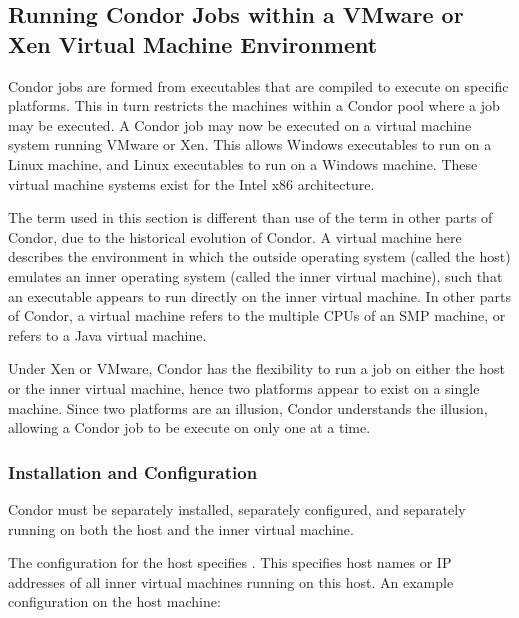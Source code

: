 \subsection{\label{sec:Virtual-Machines}
Running Condor Jobs within a VMware or Xen Virtual Machine Environment}

Condor jobs are formed from executables that are compiled to execute
on specific platforms.
This in turn restricts the machines within a Condor pool where
a job may be executed.
A Condor job may now be executed on a 
virtual machine system running VMware or Xen.
This allows Windows executables to run on a Linux machine,
and Linux executables to run on a Windows machine.
These virtual machine systems exist for the Intel x86 architecture.

The term  used in this section is different
than use of the term in other parts of Condor,
due to the historical evolution of Condor.
A virtual machine here describes the environment in which
the outside operating system (called the host) emulates an inner operating
system (called the inner virtual machine),
such that an executable appears to run directly
on the inner virtual machine.
In other parts of Condor, a virtual machine refers to the
multiple CPUs of an SMP machine, or refers to a Java virtual machine.

Under Xen or VMware, 
Condor has the flexibility to run a job on either the host
or the inner virtual machine, 
hence two platforms appear to exist on a single machine.
Since two platforms are an illusion, Condor understands the illusion, 
allowing a Condor job to be execute on only
one at a time.

\subsubsection{\label{sec:Virtual-Machines-Configuration}
Installation and Configuration}

Condor must be separately installed, separately configured,
and separately running on both
the host and the inner virtual machine.

The configuration for the host specifies .
This specifies host names or IP addresses of all inner virtual machines
running on this host.
An example configuration on the host machine:

